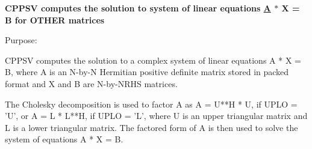 {\bfseries  C\+P\+P\+S\+V computes the solution to system of linear equations \hyperlink{classA}{A} $\ast$ X = B for O\+T\+H\+E\+R matrices} 

 \begin{DoxyParagraph}{Purpose\+: }
\begin{DoxyVerb} CPPSV computes the solution to a complex system of linear equations
    A * X = B,
 where A is an N-by-N Hermitian positive definite matrix stored in
 packed format and X and B are N-by-NRHS matrices.

 The Cholesky decomposition is used to factor A as
    A = U**H * U,  if UPLO = 'U', or
    A = L * L**H,  if UPLO = 'L',
 where U is an upper triangular matrix and L is a lower triangular
 matrix.  The factored form of A is then used to solve the system of
 equations A * X = B.\end{DoxyVerb}
 
\end{DoxyParagraph}

